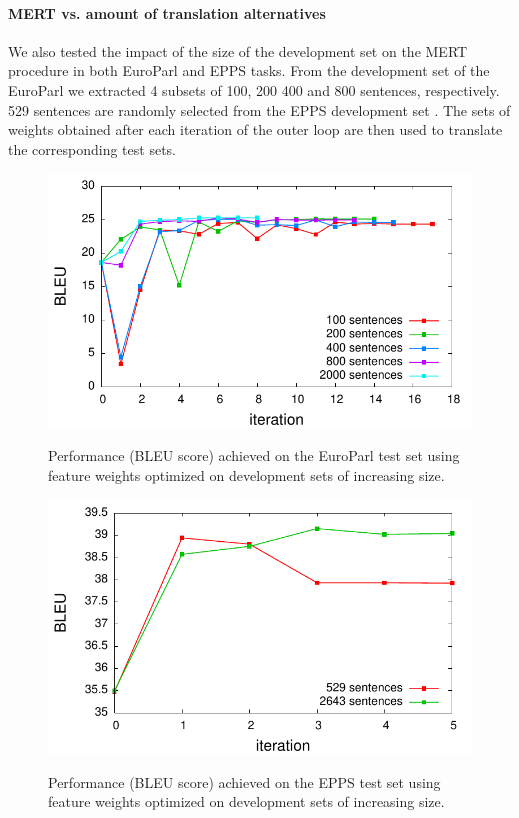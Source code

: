 \documentclass[11pt]{report}
\theoremstyle{plain}
\begin{document}
{\paragraph{MERT vs. amount of translation alternatives}
We also tested the impact of the size of the development set on the MERT procedure in both EuroParl and EPPS tasks. 
From the  development set of the EuroParl we extracted 4 subsets of 100, 200 400 and 800 sentences, respectively. 529 sentences are randomly selected from the EPPS development set .
The sets of weights obtained after each iteration of the outer loop are then used to translate the corresponding test sets.

\begin{figure}
\begin{center}
\label{fig:MERT-europarl-devsize}
 \includegraphics[width=0.75\columnwidth]{europarl-devsize}
\caption{Performance (BLEU score) achieved on the EuroParl test set using feature weights optimized on  development sets of increasing size.}
\end{center}
 \end{figure}


\begin{figure}
\begin{center}
\label{fig:MERT-epps-devsize}
 \includegraphics[width=0.75\columnwidth]{epps-cn-devsize}
\caption{Performance (BLEU score) achieved on the EPPS test set using feature weights optimized on  development sets of increasing size.}
\end{center}
 \end{figure}

}
\end{document}
